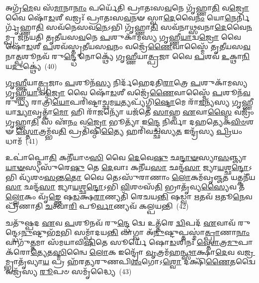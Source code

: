 𑌅𑌗𑍍𑌰᳴\-\ul{𑌮𑍇}\-𑌵 𑌸᳴\-\ul{𑌮𑌾}\-𑌨𑌾\-\ul{𑌨𑌾𑌂} 𑌪𑌰𑍍𑌯𑍇᳴𑌤𑌿 𑌪𑍍𑌰𑌾𑌤𑌃𑌸\-\ul{𑌵}\-𑌨𑍇 𑌗𑍃᳴𑌹𑍍𑌣𑌾\-\ul{𑌤𑌿} 𑌵\-\ul{𑌜𑍍𑌰𑍋} 𑌵𑍈 𑌷𑍋᳴\-\ul{𑌡}\-𑌶𑍀 𑌵𑌜𑍍𑌰𑌃᳴ 𑌪𑍍𑌰𑌾𑌤𑌃𑌸\-\ul{𑌵}\-𑌨𑍟 𑌸𑍍𑌵𑌾\-\ul{𑌦𑍇}\-𑌵𑍈\-\ul{𑌨𑌂} 𑌯𑍋\-\ul{𑌨𑍇}\-𑌰𑍍𑌨𑌿𑌰𑍍𑌗𑍃᳴𑌹𑍍𑌣𑌾\-\ul{𑌤𑌿} 𑌸𑌵᳴𑌨𑍇𑌸𑌵\-\ul{𑌨𑍇}\-\-𑌽𑌭𑌿 𑌗𑍃᳴𑌹𑍍𑌣𑌾\-\ul{𑌤𑌿} 𑌸𑌵᳴𑌨𑌾𑌥𑍍𑌸𑌵𑌨𑌾\-\ul{𑌦𑍇}\-𑌵𑍈\-\ul{𑌨}\-𑌮𑍍𑌪𑍍𑌰 𑌜᳴𑌨𑌯𑌤𑌿 𑌤𑍃𑌤𑍀𑌯𑌸\-\ul{𑌵}\-𑌨𑍇 \ul{𑌪}\-𑌶𑍁𑌕𑌾᳴𑌮𑌸𑍍𑌯 𑌗𑍃𑌹𑍍𑌣𑍀\-\ul{𑌯𑌾}\-𑌦𑍍𑌵\-\ul{𑌜𑍍𑌰𑍋} 𑌵𑍈 𑌷𑍋᳴\-\ul{𑌡}\-𑌶𑍀 \ul{𑌪}\-𑌶𑌵᳴𑌸𑍍𑌤𑍃𑌤𑍀𑌯𑌸\-\ul{𑌵}\-𑌨𑌂 𑌵𑌜𑍍𑌰𑍇᳴\-\ul{𑌣𑍈}\-𑌵𑌾𑌸𑍍𑌮𑍈᳴ 𑌤𑍃𑌤𑍀𑌯𑌸\-\ul{𑌵}\-𑌨𑌾\-\ul{𑌤𑍍𑌪}\-𑌶𑍂𑌨𑌵᳴ 𑌰𑍁\-\ul{𑌨𑍍𑌦𑍍𑌧𑍇} 𑌨𑍋𑌕𑍍𑌥𑍍𑌯𑍇᳴ 𑌗𑍃𑌹𑍍𑌣𑍀𑌯𑌾\-\ul{𑌤𑍍𑌪𑍍𑌰}\-𑌜𑌾 𑌵𑍈 \ul{𑌪}\-𑌶𑌵᳴ \ul{𑌉}\-𑌕𑍍𑌥𑌾\-\ul{𑌨𑌿} 𑌯\-\ul{𑌦𑍁}\-𑌕𑍍𑌥𑍍𑌯𑍇॑~(40)

\-\ul{𑌗𑍃}\-\-\ul{𑌹𑍍𑌣𑍀}\-𑌯𑌾\-\ul{𑌤𑍍𑌪𑍍𑌰}\-𑌜𑌾𑌂 \ul{𑌪}\-𑌶𑍂𑌨᳴\-\ul{𑌸𑍍𑌯} 𑌨𑌿𑌰𑍍𑌦᳴𑌹𑍇𑌦𑌤𑌿\-\ul{𑌰𑌾}\-𑌤𑍍𑌰𑍇 \ul{𑌪}\-𑌶𑍁𑌕𑌾᳴𑌮𑌸𑍍𑌯 𑌗𑍃𑌹𑍍𑌣𑍀\-\ul{𑌯𑌾}\-𑌦𑍍𑌵\-\ul{𑌜𑍍𑌰𑍋} 𑌵𑍈 𑌷𑍋᳴\-\ul{𑌡}\-𑌶𑍀 𑌵𑌜𑍍𑌰𑍇᳴\-\ul{𑌣𑍈}\-𑌵𑌾𑌸𑍍𑌮𑍈᳴ \ul{𑌪}\-𑌶𑍂𑌨᳴\-\ul{𑌵}\-𑌰𑍁\-\ul{𑌧𑍍𑌯} 𑌰𑌾𑌤𑍍𑌰𑌿᳴\-\ul{𑌯𑍋}\-𑌪𑌰𑌿᳴𑌷𑍍𑌟𑌾𑌚𑍍𑌛𑌮\-\ul{𑌯}\-𑌤𑍍𑌯𑌪𑍍𑌯᳴𑌗𑍍𑌨𑌿\-\ul{𑌷𑍍𑌟𑍋}\-𑌮𑍇 𑌰𑌾᳴\-\ul{𑌜}\-𑌨𑍍𑌯᳴𑌸𑍍𑌯 𑌗𑍃𑌹𑍍𑌣𑍀𑌯𑌾\-\ul{𑌦𑍍𑌵𑍍𑌯𑌾}\-𑌵𑍃𑌤𑍍𑌕𑌾᳴\-\ul{𑌮𑍋} 𑌹𑌿 𑌰𑌾᳴\-\ul{𑌜}\-𑌨𑍍𑌯𑍋᳴ 𑌯𑌜᳴𑌤𑍇 \ul{𑌸𑌾}\-𑌹𑍍𑌨 \ul{𑌏}\-𑌵𑌾\-\ul{𑌸𑍍𑌮𑍈} 𑌵𑌜𑍍𑌰𑌂᳴ 𑌗𑍃𑌹𑍍𑌣𑌾\-\ul{𑌤𑌿} 𑌸 𑌏᳴\-\ul{𑌨𑌂} 𑌵\-\ul{𑌜𑍍𑌰𑍋} 𑌭𑍂𑌤𑍍𑌯𑌾᳴ 𑌇\-\ul{𑌨𑍍𑌦𑍍𑌧𑍇} 𑌨𑌿𑌰𑍍𑌵𑌾 𑌦𑌹𑌤𑍍𑌯𑍇𑌕\-\ul{𑌵𑌿}\-\-\ul{𑍞}\-𑌶𑍟 \ul{𑌸𑍍𑌤𑍋}\-𑌤𑍍𑌰𑌮𑍍𑌭᳴𑌵\-\ul{𑌤𑌿} 𑌪𑍍𑌰𑌤𑌿᳴𑌷𑍍𑌠𑌿\-\ul{𑌤𑍍𑌯𑍈} 𑌹𑌰𑌿᳴𑌵𑌚𑍍𑌛𑌸𑍍𑌯\-\ul{𑌤} 𑌇𑌨𑍍𑌦𑍍𑌰᳴𑌸𑍍𑌯 \ul{𑌪𑍍𑌰𑌿}\-𑌯𑌂 𑌧𑌾𑌮᳴~(41)

𑌉𑌪𑌾॑𑌪𑍍𑌨𑍋\-\ul{𑌤𑌿} 𑌕𑌨𑍀᳴𑌯𑌾𑍞\-\ul{𑌸𑌿} 𑌵𑍈 \ul{𑌦𑍇}\-𑌵𑍇\-\ul{𑌷𑍁} 𑌛\-\ul{𑌨𑍍𑌦𑌾}\-\-\ul{𑍟}\-𑌸𑍍𑌯𑌾\-\ul{𑌸}\-𑌞𑍍𑌜𑍍𑌯𑌾\-\ul{𑌯𑌾}\-\-\ul{𑍟}\-𑌸𑍍𑌯𑌸𑍁᳴𑌰𑍇\-\ul{𑌷𑍁} 𑌤𑍇 \ul{𑌦𑍇}\-𑌵𑌾𑌃 𑌕𑌨𑍀᳴𑌯\-\ul{𑌸𑌾} 𑌛𑌨𑍍𑌦᳴\-\ul{𑌸𑌾} 𑌜𑍍𑌯𑌾\-\ul{𑌯}\-𑌶𑍍𑌛\-\ul{𑌨𑍍𑌦𑍋}\-\-𑌽𑌭𑌿 𑌵𑍍𑌯᳴𑌶𑍞\-\ul{𑌸}\-𑌨𑍍𑌤\-\ul{𑌤𑍋} 𑌵𑍈 𑌤𑍇\-𑌽𑌸𑍁᳴𑌰𑌾𑌣𑌾𑌂 \ul{𑌲𑍋}\-𑌕𑌮᳴𑌵𑍃𑌞𑍍𑌜\-\ul{𑌤} 𑌯𑌤𑍍𑌕𑌨𑍀᳴𑌯\-\ul{𑌸𑌾} 𑌛𑌨𑍍𑌦᳴\-\ul{𑌸𑌾} 𑌜𑍍𑌯𑌾\-\ul{𑌯}\-𑌶𑍍𑌛\-\ul{𑌨𑍍𑌦𑍋}\-\-𑌽𑌭𑌿 \ul{𑌵𑌿}\-𑌶𑍞𑌸᳴\-\ul{𑌤𑌿} 𑌭𑍍𑌰𑌾𑌤𑍃᳴𑌵𑍍𑌯\-\ul{𑌸𑍍𑌯𑍈}\-𑌵 𑌤\-\ul{𑌲𑍍𑌲𑍋}\-𑌕𑌂 𑌵𑍃᳴\-\ul{𑌙𑍍𑌕𑍍𑌤𑍇} 𑌷\-\ul{𑌡}\-𑌕𑍍𑌷\-\ul{𑌰𑌾}\-𑌣𑍍𑌯𑌤𑌿᳴ 𑌰𑍇𑌚𑌯\-\ul{𑌨𑍍𑌤𑌿} 𑌷𑌡𑍍𑌵𑌾 \ul{𑌋}\-𑌤𑌵᳴ \ul{𑌋}\-𑌤𑍂\-\ul{𑌨𑍇}\-𑌵 𑌪𑍍𑌰𑍀᳴𑌣𑌾𑌤𑌿 \ul{𑌚}\-𑌤𑍍𑌵𑌾\-\ul{𑌰𑌿} 𑌪𑍂\-\ul{𑌰𑍍𑌵𑌾}\-𑌣𑍍𑌯𑌵᳴ 𑌕𑌲𑍍𑌪𑌯𑌨𑍍𑌤𑌿~(42)

𑌚𑌤𑍁᳴𑌷𑍍𑌪𑌦 \ul{𑌏}\-𑌵 \ul{𑌪}\-𑌶𑍂𑌨𑌵᳴ 𑌰𑍁\-\ul{𑌨𑍍𑌦𑍍𑌧𑍇} 𑌦𑍍𑌵𑍇 𑌉𑌤𑍍𑌤᳴𑌰𑍇 \ul{𑌦𑍍𑌵𑌿}\-𑌪𑌦᳴ \ul{𑌏}\-𑌵𑌾𑌵᳴ 𑌰𑍁𑌨𑍍𑌦𑍍𑌧𑍇\-𑌽\-\ul{𑌨𑍁}\-𑌷𑍍𑌟𑍁𑌭᳴\-\ul{𑌮}\-𑌭𑌿 𑌸𑌮𑍍𑌪𑌾᳴𑌦𑌯\-\ul{𑌨𑍍𑌤𑌿} 𑌵𑌾𑌗𑍍𑌵𑌾 𑌅᳴\-\ul{𑌨𑍁}\-𑌷𑍍𑌟𑍁𑌪𑍍𑌤𑌸𑍍𑌮𑌾॑\-\ul{𑌤𑍍𑌪𑍍𑌰𑌾}\-𑌣𑌾\-\ul{𑌨𑌾𑌂} 𑌵𑌾𑌗𑍁᳴\-\ul{𑌤𑍍𑌤}\-𑌮𑌾 𑌸᳴𑌮𑌯𑌾𑌵𑌿\-\ul{𑌷𑌿}\-𑌤𑍇 𑌸𑍂𑌰𑍍𑌯𑍇᳴ 𑌷𑍋\-\ul{𑌡}\-𑌶𑌿𑌨𑌃᳴ \ul{𑌸𑍍𑌤𑍋}\-𑌤𑍍𑌰\-\ul{𑌮𑍁}\-𑌪𑌾𑌕᳴𑌰𑍋\-\ul{𑌤𑍍𑌯𑍇}\-𑌤\-\ul{𑌸𑍍𑌮𑌿}\-𑌨𑍍𑌵𑍈 \ul{𑌲𑍋}\-𑌕 𑌇𑌨𑍍𑌦𑍍𑌰𑍋᳴ \ul{𑌵𑍃}\-𑌤𑍍𑌰𑌮᳴𑌹\-\ul{𑌨𑍍𑌥𑍍𑌸𑌾}\-𑌕𑍍𑌷𑌾\-\ul{𑌦𑍇}\-𑌵 𑌵\-\ul{𑌜𑍍𑌰}\-𑌮𑍍𑌭𑍍𑌰𑌾𑌤𑍃᳴𑌵𑍍𑌯𑌾\-\ul{𑌯} 𑌪𑍍𑌰 𑌹᳴𑌰𑌤𑍍𑌯𑌰𑍁𑌣𑌪𑌿\-\ul{𑌶𑌂}\-𑌗𑍋\-𑌽\-\ul{𑌶𑍍𑌵𑍋} 𑌦𑌕𑍍𑌷𑌿᳴\-\ul{𑌣𑍈}\-𑌤𑌦𑍍𑌵𑍈 𑌵𑌜𑍍𑌰᳴𑌸𑍍𑌯 \ul{𑌰𑍂}\-𑌪𑍞 𑌸𑌮𑍃᳴𑌦𑍍𑌧𑍍𑌯𑍈~(43)


{}%


